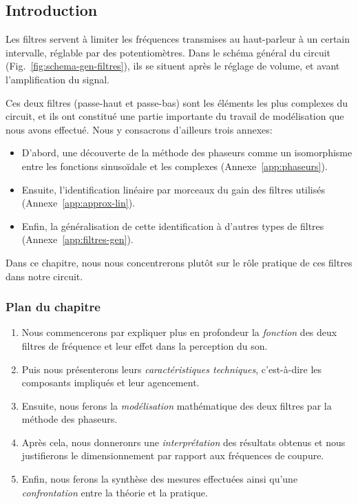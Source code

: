\subsection*{Introduction}

Les filtres servent à limiter les fréquences transmises au haut-parleur
à un certain intervalle, réglable par des potentiomètres.
Dans le schéma général du circuit (Fig.~\ref{fig:schema-gen-filtres}),
ils se situent après le réglage de volume, et avant l'amplification du signal.

Ces deux filtres (passe-haut et passe-bas) sont les éléments les plus complexes
du circuit, et ils ont constitué
une partie importante du travail de modélisation que nous avons effectué.
Nous y consacrons d'ailleurs trois annexes:
\begin{itemize}
    \item D'abord, une découverte de la méthode des phaseurs comme un isomorphisme
        entre les fonctions sinusoïdale et les complexes
        (Annexe~\ref{app:phaseurs}).
    \item Ensuite,
        l'identification linéaire par morceaux du gain des filtres utilisés
        (Annexe~\ref{app:approx-lin}).
    \item Enfin,
        la généralisation de cette identification à d'autres types de filtres
        (Annexe~\ref{app:filtres-gen}).
\end{itemize}

Dans ce chapitre,
nous nous concentrerons plutôt sur le rôle pratique de ces filtres
dans notre circuit.

\subsubsection*{Plan du chapitre}
\begin{enumerate}
    \item Nous commencerons par expliquer plus en profondeur la \emph{fonction}
        des deux filtres de fréquence et leur effet dans la perception du son.
    \item Puis nous présenterons leurs \emph{caractéristiques techniques},
        c'est-à-dire les composants impliqués et leur agencement.
    \item Ensuite, nous ferons la \emph{modélisation} mathématique
        des deux filtres
        par la méthode des phaseurs.
    \item Après cela, nous donneronrs une \emph{interprétation} des résultats
        obtenus et nous justifierons le dimensionnement par rapport
        aux fréquences de coupure.
    \item Enfin, nous ferons la synthèse des mesures effectuées ainsi qu'une
        \emph{confrontation} entre la théorie et la pratique.
\end{enumerate}
